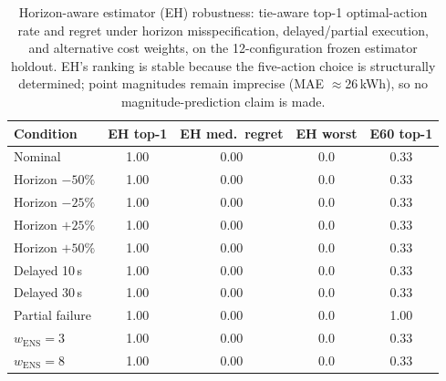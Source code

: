 \begin{table}[t]
\centering\small
\caption{Horizon-aware estimator (EH) robustness: tie-aware top-1 optimal-action
rate and regret under horizon misspecification, delayed/partial execution, and
alternative cost weights, on the 12-configuration frozen estimator holdout. EH's
ranking is stable because the five-action choice is structurally determined;
point magnitudes remain imprecise (MAE $\approx$26\,kWh), so no
magnitude-prediction claim is made.}
\label{tab:eh-v3}
\begin{tabular}{lcccc}
\toprule
Condition & EH top-1 & EH med.\ regret & EH worst & E60 top-1 \\
\midrule
Nominal            & 1.00 & 0.00 & 0.0 & 0.33 \\
Horizon $-50\%$    & 1.00 & 0.00 & 0.0 & 0.33 \\
Horizon $-25\%$    & 1.00 & 0.00 & 0.0 & 0.33 \\
Horizon $+25\%$    & 1.00 & 0.00 & 0.0 & 0.33 \\
Horizon $+50\%$    & 1.00 & 0.00 & 0.0 & 0.33 \\
Delayed 10\,s      & 1.00 & 0.00 & 0.0 & 0.33 \\
Delayed 30\,s      & 1.00 & 0.00 & 0.0 & 0.33 \\
Partial failure    & 1.00 & 0.00 & 0.0 & 1.00 \\
$w_{\text{ENS}}=3$ & 1.00 & 0.00 & 0.0 & 0.33 \\
$w_{\text{ENS}}=8$ & 1.00 & 0.00 & 0.0 & 0.33 \\
\bottomrule
\end{tabular}
\end{table}
